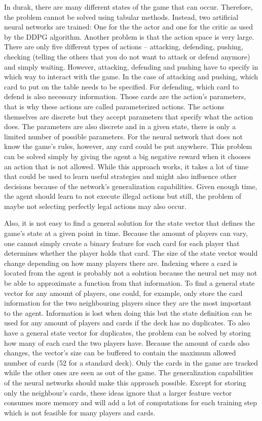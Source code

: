 \documentclass[a4paper,titlepage]{article}
\begin{document}
\label{sec:challenges}
In durak, there are many different states of the game that can occur. Therefore, the problem cannot be solved using tabular methods. Instead, two artificial neural networks are trained: One for the the actor and one for the critic as used by the DDPG algorithm.
Another problem is that the action space is very large. There are only five different types of actions -- attacking, defending, pushing, checking (telling the others that you do not want to attack or defend anymore) and simply waiting. However, attacking, defending and pushing have to specify in which way to interact with the game. In the case of attacking and pushing, which card to put on the table needs to be specified. For defending, which card to defend is also necessary information. Those cards are the action's parameters, that is why these actions are called parameterized actions. The actions themselves are discrete but they accept parameters that specify what the action does. The parameters are also discrete and in a given state, there is only a limited number of possible parameters. For the neural network that does not know the game's rules, however, any card could be put anywhere. This problem can be solved simply by giving the agent a big negative reward when it chooses an action that is not allowed. While this approach works, it takes a lot of time that could be used to learn useful strategies and might also influence other decisions because of the network's generalization capabilities. Given enough time, the agent should learn to not execute illegal actions but still, the problem of maybe not selecting perfectly legal actions may also occur.

Also, it is not easy to find a general solution for the state vector that defines the game's state at a given point in time. Because the amount of players can vary, one cannot simply create a binary feature for each card for each player that determines whether the player holds that card. The size of the state vector would change depending on how many players there are. Indexing where a card is located from the agent is probably not a solution because the neural net may not be able to approximate a function from that information.
To find a general state vector for any amount of players, one could, for example, only store the card information for the two neighbouring players since they are the most important to the agent. Information is lost when doing this but the state definition can be used for any amount of players and cards if the deck has no duplicates. To also have a general state vector for duplicates, the problem can be solved by storing how many of each card the two players have.
Because the amount of cards also changes, the vector's size can be buffered to contain the maximum allowed number of cards (52 for a standard deck). Only the cards in the game are tracked while the other ones are seen as out of the game. The generalization capabilities of the neural networks should make this approach possible.
Except for storing only the neighbour's cards, these ideas ignore that a larger feature vector consumes more memory and will add a lot of computations for each training step which is not feasible for many players and cards.
\end{document}
